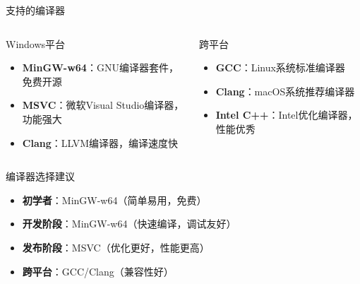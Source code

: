 \documentclass[UTF8,aspectratio=169]{beamer}
\begin{document}
\begin{frame}{支持的编译器}
    \begin{columns}
        \begin{column}{0.48\textwidth}
            \begin{ytublock}{Windows平台}
                \begin{itemize}
                    \item \textbf{MinGW-w64}：GNU编译器套件，免费开源
                    \item \textbf{MSVC}：微软Visual Studio编译器，功能强大
                    \item \textbf{Clang}：LLVM编译器，编译速度快
                \end{itemize}
            \end{ytublock}
        \end{column}
        \hspace{0.02\textwidth}
        \begin{column}{0.48\textwidth}
            \begin{ytublock}{跨平台}
                \begin{itemize}
                    \item \textbf{GCC}：Linux系统标准编译器
                    \item \textbf{Clang}：macOS系统推荐编译器
                    \item \textbf{Intel C++}：Intel优化编译器，性能优秀
                \end{itemize}
            \end{ytublock}
        \end{column}
    \end{columns}

    \begin{ytublock}{编译器选择建议}
        \begin{itemize}
            \item \textbf{初学者}：MinGW-w64（简单易用，免费）
            \item \textbf{开发阶段}：MinGW-w64（快速编译，调试友好）
            \item \textbf{发布阶段}：MSVC（优化更好，性能更高）
            \item \textbf{跨平台}：GCC/Clang（兼容性好）
        \end{itemize}
    \end{ytublock}
\end{frame}
\end{document}
